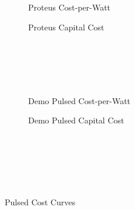 \begin{figure*}
    \centering
    \hfill 
    \begin{subfigure}[t]{0.45\textwidth}
        \centering
		\begin{adjustbox}{width=\textwidth}
			\Large
			
		\end{adjustbox}
        \caption{Proteus Cost-per-Watt}
    \end{subfigure}
    \hfill
    \begin{subfigure}[t]{0.45\textwidth}
        \centering
		\begin{adjustbox}{width=\textwidth}
			\Large
			
		\end{adjustbox}
        \caption{Proteus Capital Cost}
    \end{subfigure}
    \hfill \hfill ~\\ ~\\ ~\\ ~\\
    \hfill 
    \begin{subfigure}[t]{0.45\textwidth}
        \centering
		\begin{adjustbox}{width=\textwidth}
			\Large
			
		\end{adjustbox}
        \caption{Demo Pulsed Cost-per-Watt}
    \end{subfigure}
    \hfill
    \begin{subfigure}[t]{0.45\textwidth}
        \centering
		\begin{adjustbox}{width=\textwidth}
			\Large
			
		\end{adjustbox}
        \caption{Demo Pulsed Capital Cost}
    \end{subfigure}	
    \hfill \hfill ~\\ ~\\ ~\\
    \caption{Pulsed Cost Curves}
    \label{fig:pulsed_costs} ~ \\
\end{figure*}

